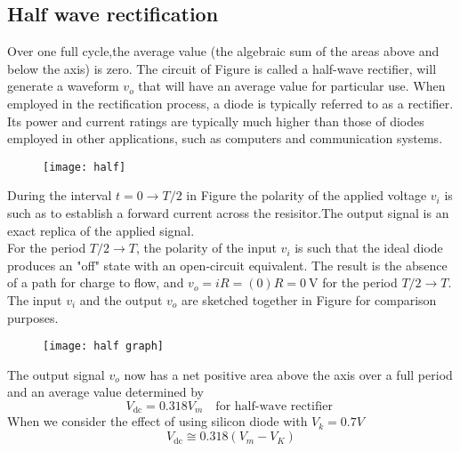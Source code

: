 \subsection{Half wave rectification}
Over one full cycle,the average value (the algebraic sum of the areas above and below the axis) is zero. The circuit of Figure is called a half-wave rectifier, will generate a waveform $v_{o}$ that will have an average value for particular use. When employed in the rectification process, a diode is typically referred to as a rectifier. Its power and current ratings are typically much higher than those of diodes employed in other applications, such as computers and communication systems.
\begin{figure}[H]
\centering
\texttt{[image: half]}
\caption{}
\label{}
\end{figure}
 During the interval $t=0 \rightarrow T / 2$ in Figure the polarity of the applied voltage $v_{i}$ is such as to establish a forward current across the resisitor.The output signal is an exact replica of the applied signal. \\
For the period $T / 2 \rightarrow T$, the polarity of the input $v_{i}$ is such that the ideal diode produces an "off" state with an open-circuit equivalent. The result is the absence of a path for charge to flow, and $v_{o}=i R=(0) R=0 \mathrm{~V}$ for the period $T / 2 \rightarrow T$. \\
The input $v_{i}$ and the output $v_{o}$ are sketched together in Figure for comparison purposes.
\begin{figure}[H]
\centering
\texttt{[image: half graph]}
\caption{}
\label{}
\end{figure}
The output signal $v_{o}$ now has a net positive area above the axis over a full period and an average value determined by 
$$V_{\mathrm{dc}}=0.318 V_{m}\quad \text{for half-wave rectifier }$$
When we consider the effect of using silicon diode with $V_k=0.7V$
$$V_{\mathrm{dc}} \cong 0.318\left(V_{m}-V_{K}\right)$$
